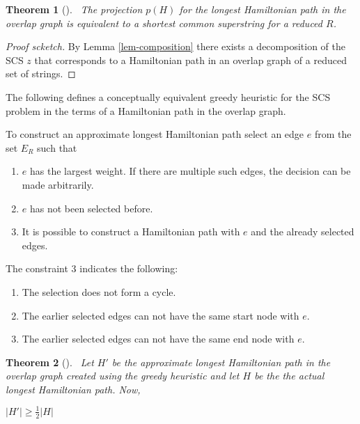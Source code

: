 \documentclass[english,twoside,censored,csm,algorithms-track-2020]{HYthesisML}
\theoremstyle{plain}
\newtheorem{theorem}{Theorem}[chapter]
\theoremstyle{definition}
\begin{document}
\begin{theorem} [] ~\label{lem-similarity-between-SCS-Hamp}
  The projection $p(H)$ for the longest Hamiltonian path in the overlap graph is equivalent to
  a shortest common superstring for a reduced $R$.
\end{theorem}
\begin{proof}[Proof scketch]
By Lemma \ref{lem-composition} there exists a decomposition of the SCS $z$ that corresponds to a
Hamiltonian path in an overlap graph of a reduced set of strings.
\end{proof}

The following defines a conceptually equivalent greedy heuristic for the SCS problem in the terms of
a Hamiltonian path in the overlap graph.

To  construct an approximate longest Hamiltonian path select an edge $e$ from the set $E_R$ such that

\begin{enumerate}
\item $e$ has the largest weight. If there are multiple such edges, the decision can be made arbitrarily.
\item $e$ has not been selected before.
\item It is possible to construct a Hamiltonian path with $e$ and the already selected edges. 
\end{enumerate}

The constraint 3 indicates the following:
\begin{enumerate}[i]
\item The selection does not form a cycle.
\item The earlier selected edges can not have the same start node with $e$.
\item The earlier selected edges can not have the same end node with $e$.
\end{enumerate}






\begin{theorem}[]~\label{theorem-heuristic-bound}
  Let $H'$ be the approximate longest Hamiltonian path in the overlap graph created using
  the greedy heuristic and let $H$ be the the actual longest Hamiltonian path. Now,
  
  $|H'|\geq \frac{1}{2}|H|$
  
\end{theorem}
\end{document}
